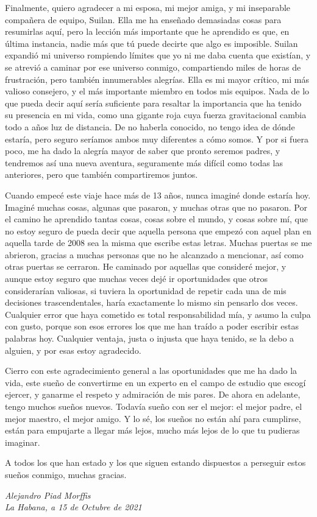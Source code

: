 Finalmente, quiero agradecer a mi esposa, mi mejor amiga, y mi inseparable compañera de equipo, Suilan.
Ella me ha enseñado demasiadas cosas para resumirlas aquí, pero la lección más importante que he aprendido es que, en última instancia, nadie más que tú puede decirte que algo es imposible.
Suilan expandió mi universo rompiendo límites que yo ni me daba cuenta que existían, y se atrevió a caminar por ese universo conmigo, compartiendo miles de horas de frustración, pero también innumerables alegrías.
Ella es mi mayor crítico, mi más valioso consejero, y el más importante miembro en todos mis equipos.
Nada de lo que pueda decir aquí sería suficiente para resaltar la importancia que ha tenido su presencia en mi vida, como una gigante roja cuya fuerza gravitacional cambia todo a años luz de distancia.
De no haberla conocido, no tengo idea de dónde estaría, pero seguro seríamos ambos muy diferentes a cómo somos.
Y por si fuera poco, me ha dado la alegría mayor de saber que pronto seremos padres, y tendremos así una nueva aventura, seguramente más difícil como todas las anteriores, pero que también compartiremos juntos.

Cuando empecé este viaje hace más de 13 años, nunca imaginé donde estaría hoy.
Imaginé muchas cosas, algunas que pasaron, y muchas otras que no pasaron.
Por el camino he aprendido tantas cosas, cosas sobre el mundo, y cosas sobre mí, que no estoy seguro de pueda decir que aquella persona que empezó con aquel plan en aquella tarde de 2008 sea la misma que escribe estas letras.
Muchas puertas se me abrieron, gracias a muchas personas que no he alcanzado a mencionar, así como otras puertas se cerraron.
He caminado por aquellas que consideré mejor, y aunque estoy seguro que muchas veces dejé ir oportunidades que otros considerarían valiosas, si tuviera la oportunidad de repetir cada una de mis decisiones trascendentales, haría exactamente lo mismo sin pensarlo dos veces.
Cualquier error que haya cometido es total responsabilidad mía, y asumo la culpa con gusto, porque son esos errores los que me han traído a poder escribir estas palabras hoy.
Cualquier ventaja, justa o injusta que haya tenido, se la debo a alguien, y por esas estoy agradecido.

Cierro con este agradecimiento general a las oportunidades que me ha dado la vida, este sueño de convertirme en un experto en el campo de estudio que escogí ejercer, y ganarme el respeto y admiración de mis pares.
De ahora en adelante, tengo muchos sueños nuevos.
Todavía sueño con ser el mejor: el mejor padre, el mejor maestro, el mejor amigo.
Y lo sé, los sueños no están ahí para cumplirse, están para empujarte a llegar más lejos, mucho más lejos de lo que tu pudieras imaginar.

A todos los que han estado y los que siguen estando dispuestos a perseguir estos sueños conmigo, muchas gracias.

\vspace{1cm}
\begin{flushright}
{\it Alejandro Piad Morffis}\\
{\it La Habana, a 15 de Octubre de 2021}
\end{flushright}
